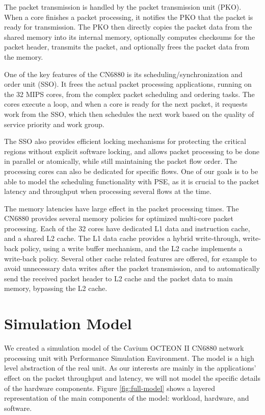 The packet transmission is handled by the packet transmission unit (PKO). When a core finishes a packet processing, it notifies the PKO that the packet is ready for transmission. The PKO then directly copies the packet data from the shared memory into its internal memory, optionally computes checksums for the packet header, transmits the packet, and optionally frees the packet data from the memory.~\cite{cavium:2010:fundamentals}

One of the key features of the CN6880 is its scheduling/synchronization and order unit (SSO). It frees the actual packet processing applications, running on the 32 MIPS cores, from the complex packet scheduling and ordering tasks. The cores execute a loop, and when a core is ready for the next packet, it requests work from the SSO, which then schedules the next work based on the quality of service priority and work group.~\cite{cavium:2010:fundamentals}

The SSO also provides efficient locking mechanisms for protecting the critical regions without explicit software locking, and allows packet processing to be done in parallel or atomically, while still maintaining the packet flow order. The processing cores can also be dedicated for specific flows. One of our goals is to be able to model the scheduling functionality with PSE, as it is crucial to the packet latency and throughput when processing several flows at the time.~\cite{cavium:2010:fundamentals}

The memory latencies have large effect in the packet processing times. The CN6880 provides several memory policies for optimized multi-core packet processing. Each of the 32 cores have dedicated L1 data and instruction cache, and a shared L2 cache. The L1 data cache provides a hybrid write-through, write-back policy, using a write buffer mechanism, and the L2 cache implements a write-back policy. Several other cache related features are offered, for example to avoid unnecessary data writes after the packet transmission, and to automatically send the received packet header to L2 cache and the packet data to main memory, bypassing the L2 cache.~\cite{cavium:2010:fundamentals}

\section{Simulation Model}
\label{sec:simulation-model}

We created a simulation model of the Cavium OCTEON II CN6880 network processing unit with Performance Simulation Environment. The model is a high level abstraction of the real unit. As our interests are mainly in the applications' effect on the packet throughput and latency, we will not model the specific details of the hardware components. Figure \ref{fig:full-model} shows a layered representation of the main components of the model: workload, hardware, and software.


